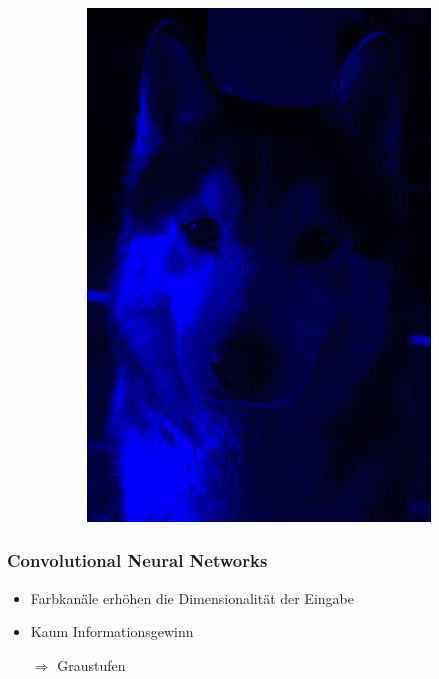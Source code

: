 \documentclass[12pt,utf8]{beamer}
\begin{document}
\begin{frame}
\begin{figure}
\begin{subfigure}[b]{0.3\textwidth}
				\includegraphics[scale=0.07]{resources/doggo_blue.jpg}
			\end{subfigure}
			
			\cite{doggo}
		\end{figure}
	\end{frame}
	
	\begin{frame}
		\frametitle{Convolutional Neural Networks}
		\begin{itemize}
			\item Farbkanäle erhöhen die Dimensionalität der Eingabe
			\item Kaum Informationsgewinn
			\item[$\Rightarrow$] Graustufen
		\end{itemize}
	\end{frame}
	
\end{document}
